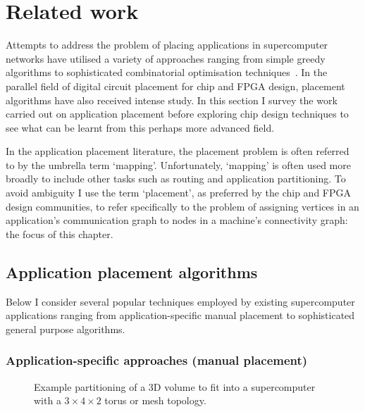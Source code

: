 	\section{Related work}
		
		Attempts to address the problem of placing applications in supercomputer
		networks have utilised a variety of approaches ranging from simple greedy
		algorithms to sophisticated combinatorial optimisation
		techniques~\cite{jeannot14}. In the parallel field of digital circuit
		placement for chip and FPGA design, placement algorithms have also received
		intense study.  In this section I survey the work carried out on
		application placement before exploring chip design techniques to see what
		can be learnt from this perhaps more advanced field.
		
		In the application placement literature, the placement problem is often
		referred to by the umbrella term `mapping'. Unfortunately, `mapping' is
		often used more broadly to include other tasks such as routing and
		application partitioning. To avoid ambiguity I use the term `placement', as
		preferred by the chip and FPGA design communities, to refer specifically to
		the problem of assigning vertices in an application's communication graph
		to nodes in a machine's connectivity graph: the focus of this chapter.
		
		\subsection{Application placement algorithms}
			
			Below I consider several popular techniques employed by existing
			supercomputer applications ranging from application-specific manual
			placement to sophisticated general purpose algorithms.
			
			\subsubsection{Application-specific approaches (manual placement)}
				
				\begin{figure}
					\center
					
					\caption[Partitioning of a 3D volume for a $3\times4\times2$ torus.]%
					{Example partitioning of a 3D volume to fit into a supercomputer with
					a $3\times4\times2$ torus or mesh topology.}
					\label{fig:fem-partitioning}
				\end{figure}
				
